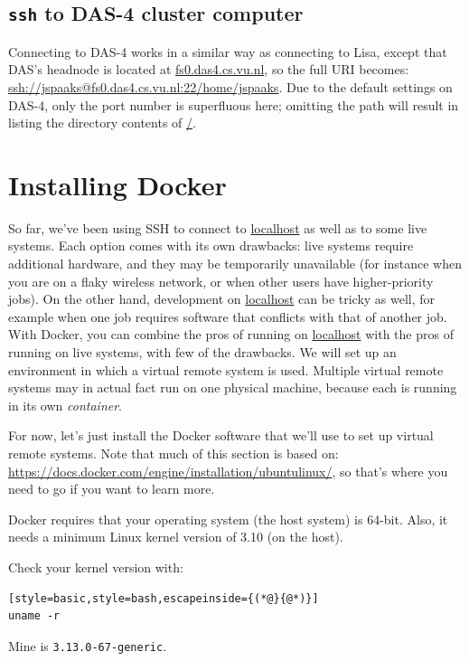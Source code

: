 \documentclass[12pt, a4paper, twoside, openany, titlepage]{book}
\begin{document}
\subsection{\texttt{ssh} to DAS-4 cluster computer}

Connecting to DAS-4 works in a similar way as connecting to Lisa, except that DAS's headnode is located at \url{fs0.das4.cs.vu.nl}, so the full URI becomes:\\ \url{ssh://jspaaks@fs0.das4.cs.vu.nl:22/home/jspaaks}. Due to the default settings on DAS-4, only the port number is superfluous here; omitting the path will result in listing the directory contents of \url{/}.


\section{Installing Docker}

\label{sec:docker}



So far, we've been using SSH to connect to \url{localhost} as well as to some live systems. Each option comes with its own drawbacks: live systems require additional hardware, and they may be temporarily unavailable (for instance when you are on a flaky wireless network, or when other users have higher-priority jobs). On the other hand, development on \url{localhost} can be tricky as well, for example when one job requires software that conflicts with that of another job.
%
With Docker, you can combine the pros of running on \url{localhost} with the pros of running on live systems, with few of the drawbacks.
%
We will set up an environment in which a virtual remote system is used. Multiple virtual remote systems may in actual fact run on one physical machine, because each is running in its own \textit{container}.

For now, let's just install the Docker software that we'll use to set up virtual remote systems. Note that much of this section is based on: \url{https://docs.docker.com/engine/installation/ubuntulinux/}, so that's where you need to go if you want to learn more.

Docker requires that your operating system (the host system) is 64-bit. Also, it needs a minimum Linux kernel version of 3.10 (on the host).

Check your kernel version with:
\begin{lstlisting}[style=basic,style=bash,escapeinside={(*@}{@*)}]
uname -r
\end{lstlisting}
Mine is \texttt{3.13.0-67-generic}.
\end{document}
